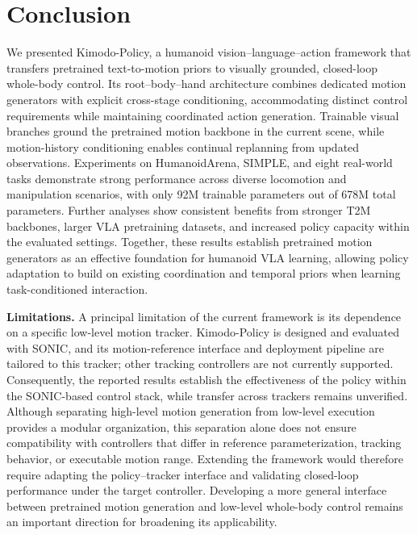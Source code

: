 \section{Conclusion}
\label{sec:conclusion}

We presented Kimodo-Policy, a humanoid vision–language–action framework that transfers pretrained text-to-motion priors to visually grounded, closed-loop whole-body control. Its root–body–hand architecture combines dedicated motion generators with explicit cross-stage conditioning, accommodating distinct control requirements while maintaining coordinated action generation. Trainable visual branches ground the pretrained motion backbone in the current scene, while motion-history conditioning enables continual replanning from updated observations. Experiments on HumanoidArena, SIMPLE, and eight real-world tasks demonstrate strong performance across diverse locomotion and manipulation scenarios, with only 92M trainable parameters out of 678M total parameters. Further analyses show consistent benefits from stronger T2M backbones, larger VLA pretraining datasets, and increased policy capacity within the evaluated settings. Together, these results establish pretrained motion generators as an effective foundation for humanoid VLA learning, allowing policy adaptation to build on existing coordination and temporal priors when learning task-conditioned interaction.

\textbf{Limitations.} A principal limitation of the current framework is its dependence on a specific low-level motion tracker. Kimodo-Policy is designed and evaluated with SONIC, and its motion-reference interface and deployment pipeline are tailored to this tracker; other tracking controllers are not currently supported. Consequently, the reported results establish the effectiveness of the policy within the SONIC-based control stack, while transfer across trackers remains unverified. Although separating high-level motion generation from low-level execution provides a modular organization, this separation alone does not ensure compatibility with controllers that differ in reference parameterization, tracking behavior, or executable motion range. Extending the framework would therefore require adapting the policy–tracker interface and validating closed-loop performance under the target controller. Developing a more general interface between pretrained motion generation and low-level whole-body control remains an important direction for broadening its applicability.

